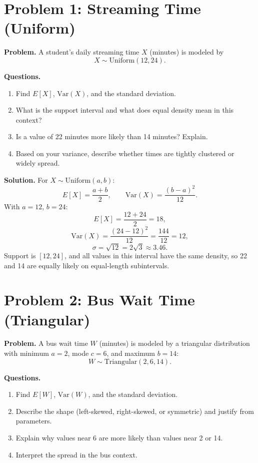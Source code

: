 \section{Problem 1: Streaming Time (Uniform)}

\textbf{Problem.}
A student's daily streaming time \(X\) (minutes) is modeled by
\[
X\sim \text{Uniform}(12,24).
\]

\textbf{Questions.}
\begin{enumerate}
  \item Find \(E[X]\), \(\mathrm{Var}(X)\), and the standard deviation.
  \item What is the support interval and what does equal density mean in this context?
  \item Is a value of 22 minutes more likely than 14 minutes? Explain.
  \item Based on your variance, describe whether times are tightly clustered or widely spread.
\end{enumerate}

\textbf{Solution.}
For \(X\sim\text{Uniform}(a,b)\):
\[
E[X]=\frac{a+b}{2},\qquad \mathrm{Var}(X)=\frac{(b-a)^2}{12}.
\]
With \(a=12\), \(b=24\):
\[
E[X]=\frac{12+24}{2}=18,
\]
\[
\mathrm{Var}(X)=\frac{(24-12)^2}{12}=\frac{144}{12}=12,
\]
\[
\sigma=\sqrt{12}=2\sqrt{3}\approx 3.46.
\]
Support is \([12,24]\), and all values in this interval have the same density, so 22 and 14 are equally likely on equal-length subintervals.

\section{Problem 2: Bus Wait Time (Triangular)}

\textbf{Problem.}
A bus wait time \(W\) (minutes) is modeled by a triangular distribution with minimum \(a=2\), mode \(c=6\), and maximum \(b=14\):
\[
W\sim \text{Triangular}(2,6,14).
\]

\textbf{Questions.}
\begin{enumerate}
  \item Find \(E[W]\), \(\mathrm{Var}(W)\), and the standard deviation.
  \item Describe the shape (left-skewed, right-skewed, or symmetric) and justify from parameters.
  \item Explain why values near 6 are more likely than values near 2 or 14.
  \item Interpret the spread in the bus context.
\end{enumerate}


